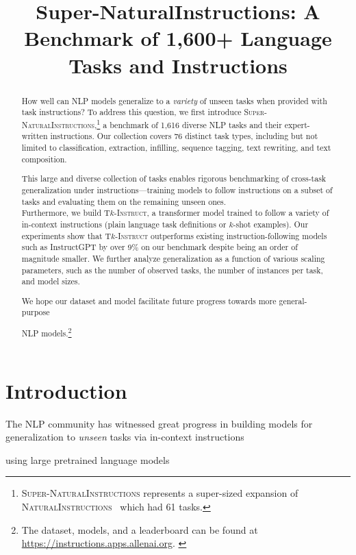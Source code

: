 \title{Super-NaturalInstructions: A Benchmark of 1,600+ Language Tasks and Instructions}

\begin{abstract}
How well can NLP models generalize to a \emph{variety} of unseen tasks when provided with task instructions? To address this question, we first introduce \textsc{Super-NaturalInstructions},\footnote{\textsc{Super-NaturalInstructions} represents a super-sized expansion of \textsc{NaturalInstructions}~\cite{mishra2022cross} which had 61 tasks.} a benchmark of 1,616 diverse NLP tasks and their expert-written instructions. Our collection covers 76 distinct task types, including but not limited to classification, extraction, infilling, sequence tagging, text rewriting, and text composition.

This large and diverse collection of tasks enables rigorous benchmarking of cross-task generalization under instructions---training models to follow instructions on a subset of tasks and evaluating them on the remaining unseen ones.
\\
Furthermore, we build \textsc{T$k$-Instruct}, a transformer model trained to follow a variety of in-context instructions (plain language task definitions or $k$-shot examples). Our experiments show that \textsc{T$k$-Instruct}  outperforms existing instruction-following models such as InstructGPT by over 9\% on our benchmark despite being an order of magnitude smaller. We further analyze generalization as a function of various scaling parameters, such as the number of observed tasks, the number of instances per task, and model sizes.

We hope our dataset and model facilitate future progress towards more general-purpose 

NLP models.\footnote{
The dataset, models, and a leaderboard can be found at \url{https://instructions.apps.allenai.org}. 
\label{footnote:1}
}
\end{abstract}

\section{Introduction}

The NLP community has witnessed great progress in building models for generalization to  {\it unseen} tasks via in-context instructions~\cite{mishra2022cross,sanh2022multitask,wei2022finetuned}

using large pretrained language models 


